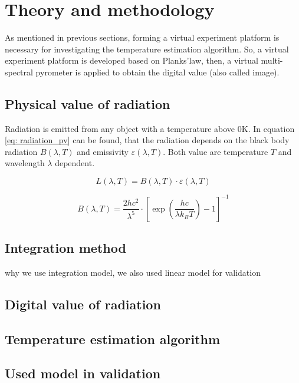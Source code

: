 \chapter{Theory and methodology}%
As mentioned in previous sections, forming a virtual experiment platform 
is necessary for investigating the temperature estimation algorithm. So, a virtual 
experiment platform is developed based on Planks'law, then, a virtual multi-spectral 
pyrometer is applied to obtain the digital value (also called image). 


\section{Physical value of radiation}%
Radiation is emitted from any object with a temperature above $0 \text{K}$. In equation \ref{eq: radiation_pv}
can be found, that the radiation depends on the black body radiation $B(\lambda, T)$ 
and emissivity $\varepsilon(\lambda, T)$. Both value are temperature $T$ and wavelength $\lambda$ 
dependent.

\begin{equation}
    \label{eq: radiation_pv}
    L(\lambda, T) = B(\lambda, T) \cdot \varepsilon (\lambda, T)
\end{equation}

%
\begin{equation}
    \label{eq: planks_law}
    B(\lambda, T) = \frac{{2hc^2}}{{\lambda^5}} \cdot {\left[{\exp\left(\frac{{hc}}{{\lambda k_B T}}\right) - 1}\right]}^{-1}
\end{equation}

\section{Integration method}%
why we use integration model, we also used linear model for validation
%
%
\section{Digital value of radiation}%

%
%

\section{Temperature estimation algorithm}


\section{Used model in validation}%

%
%
